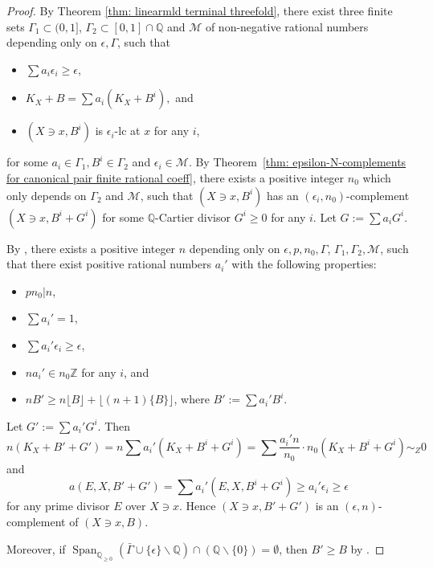 \documentclass[11pt]{amsart}
\numberwithin{equation}{section}
\newcommand\han[1]{\todo[color=yellow!40]{#1}} %
\newcommand{\Qq}{\mathbb{Q}}
\newcommand{\Zz}{\mathbb{Z}}
\newcommand{\Span}{\operatorname{Span}}
\newcommand{\Ii}{{\Gamma}}
\theoremstyle{definition}
\theoremstyle{definition}
\begin{document}
\begin{proof}
 By Theorem \ref{thm: linearmld terminal threefold}, there exist three finite sets $\Ii_1\subset(0,1]$, $\Ii_2\subset[0,1]\cap \Qq$ and $\mathcal{M}$ of non-negative rational numbers depending only on $\epsilon,\Ii$, such that 
   \begin{itemize}
       \item $\sum a_i\epsilon_i     \ge\epsilon$,
       \item  $K_X+B=\sum a_i(K_X+B^i),$ and
       \item $(X\ni x,B^i)$ is $\epsilon_i$-lc at $x$ for any $i$, 
       
     \end{itemize}
     for some $a_i\in\Ii_1,B^i\in\Ii_2$ and $\epsilon_i\in\mathcal{M}$. By Theorem~\ref{thm: epsilon-N-complements for canonical pair finite rational coeff}, there exists a positive integer $n_0$ which only depends on $\Gamma_2$ and $\mathcal{M}$, such that $({X}\ni x,{B}^i)$ has an $(\epsilon_i,n_0)$-complement $({X}\ni x,{B}^i+{G}^i)$ for some $\Qq$-Cartier divisor ${G}^i\ge0$ for any $i$.
     Let ${G}:=\sum a_i{G}^i$.
     
     By \cite[Lemma 6.2]{CH21}, there exists a positive integer $n$ depending only on $\epsilon,p,n_0,\Ii$, $\Ii_1,\Ii_2,\mathcal{M}$, such that there exist positive rational numbers $a_i'$ with the following properties:
     \begin{itemize}
         \item $pn_0|n$,
         \item $\sum a_i'=1$,
         \item $\sum a_i'\epsilon_i\ge\epsilon$,
         \item $na_i'\in n_0\Zz$ for any $i$, and
         \item $nB'\ge n\lfloor B\rfloor+\lfloor (n+1)\{B\}\rfloor$, where $B':=\sum a_i'{B}^i$.
     \end{itemize}
     Let ${G}':=\sum a_i'{G}^i$. Then
     $$
     n(K_{{X}}+B'+G')=n\sum a_i'(K_{X}+{B}^i+{G}^i)
     =\sum \frac{a_i'n}{n_0}\cdot n_0(K_{X}+{B}^i+{G}^i)\sim_Z0
     $$
     and
     $$a(E,X,B'+G')=\sum a_i'(E,X,B^i+G^i)\ge a_i'\epsilon_i\ge\epsilon$$
     for any prime divisor $E$ over $X\ni x$. Hence $(X\ni x,B'+G')$ is an $(\epsilon,n)$-complement of $(X\ni x,B)$.

     Moreover, if $\Span_{\Qq_{\ge0}}(\bar{\Ii}\cup\{\epsilon\}\backslash\Qq)\cap (\Qq\backslash\{0\})=\emptyset$, then ${B}'\ge B$ by \cite[Lemmas 6.2, 6.4]{CH21}.
     \end{proof}
\end{document}
